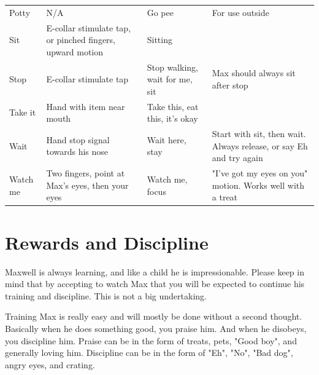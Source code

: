 \documentclass[pdftex,12pt]{article}
\begin{document}
\begin{table}[H]
\begin{adjustwidth}{-4.5cm}{-4.5cm}
\begin{center}
\begin{tabular}{lp{}p{}p{}}
                Potty       & N/A                                              & Go pee                                & For use outside                                                    \\
                Sit         & E-collar stimulate tap, or pinched fingers, upward motion                   & Sitting                                               &                                                                    \\
                Stop        & E-collar stimulate tap
                & Stop walking, wait for me, sit                        & Max
                should always sit after stop \\
                Take it     & Hand with item near mouth                        & Take this, eat this, it's okay                        &                                                                    \\
                Wait        & Hand stop signal towards his nose                & Wait here, stay                                       & Start with sit, then wait. Always release, or say Eh and try again \\
                Watch me    & Two fingers, point at Max's eyes, then your eyes & Watch me, focus                                       & "I've got my eyes on you" motion. Works well with a treat         
            \end{tabular}
            \egroup
        \end{center}
    \end{adjustwidth}
\end{table}

\newpage
\section{Rewards and Discipline}

Maxwell is always learning, and like a child he is impressionable. Please keep
in mind that by accepting to watch Max that you will be expected to continue his
training and discipline. This is not a big undertaking. 

\bigskip

Training Max is really easy and will mostly be done without a second thought.
Basically when he does something good, you praise him. And when he disobeys, you
discipline him. Praise can be in the form of treats, pets, "Good boy", and
generally loving him. Discipline can be in the form of "Eh", "No", "Bad dog",
angry eyes, and crating. 
\end{document}
